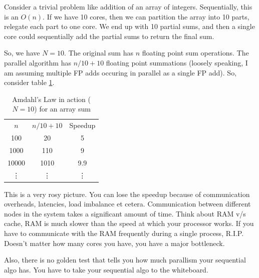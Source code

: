 \documentclass[a4paper]{article}
\begin{document}
Consider a trivial problem like addition of an array of integers.
Sequentially, this is an $O(n)$. If we have 10 cores, then we
can partition the array into 10 parts, relegate each part to one
core. We end up with 10 partial sums, and then a single core
could sequentially add the partial sums to return the final sum.

So, we have $N = 10$. The original sum has $n$ floating point sum
operations. The parallel algorithm has $n/10 + 10$ floating point
summations (loosely speaking, I am assuming multiple FP adds occuring
in parallel as a single FP add). So, consider table \ref{tab:tabam}.
\begin{table}[h]
	\centering
	\caption{Amdahl's Law in action ($N = 10$) for an array sum}
	\label{tab:tabam}
	\begin{tabular}{c c c}
		$n$ &   $n/10 + 10$ & Speedup\\
		100 & 20 & 5 \\
		1000 & 110 & 9 \\
		10000 & 1010 & 9.9 \\
		\vdots & \vdots & \vdots
	\end{tabular}
\end{table}

This is a very rosy picture. You can lose the speedup because of 
communication overheads, latencies, load imbalance et cetera. 
Communication between different nodes in the system takes a significant
amount of time. Think about RAM v/s cache, RAM is much slower than
the speed at which your processor works. If you have to communicate
with the RAM frequently during a single process, R.I.P. Doesn't
matter how many cores you have, you have a major bottleneck.

Also, there is no golden test that tells you how much parallism your
sequential algo has. You have to take your sequential algo to the
whiteboard.

\end{document}

